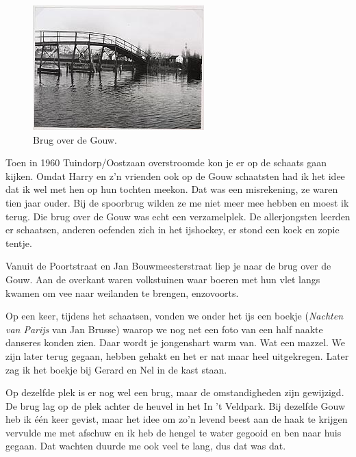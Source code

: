 \documentclass[12pt,twoside]{memoir}
\begin{document}
\begin{figure}
\includegraphics[width=\textwidth]{img/ch13/Gouwbrug}
\caption*{\footnotesize Brug over de Gouw.}
\end{figure}

Toen in 1960 Tuindorp/Oostzaan overstroomde kon je er op de schaats gaan kijken. Omdat Harry en z’n vrienden ook op de Gouw schaatsten had ik het idee dat ik wel met hen op hun tochten meekon. Dat was een misrekening, ze waren tien jaar ouder. Bij de spoorbrug wilden ze me niet meer mee hebben en moest ik terug. Die brug over de Gouw was echt een verzamelplek. De allerjongsten leerden er schaatsen, anderen oefenden zich in het ijshockey, er stond een koek en zopie tentje.

Vanuit de Poortstraat en Jan Bouwmeesterstraat liep je naar de brug over de Gouw. Aan de overkant waren volkstuinen waar boeren met hun vlet langs kwamen om vee naar weilanden te brengen, enzovoorts. 

Op een keer, tijdens het schaatsen, vonden we onder het ijs een boekje (\emph{Nachten van Parijs} van Jan Brusse) waarop we nog net een foto van een half naakte danseres konden zien. Daar wordt je jongenshart warm van. Wat een mazzel. We zijn later terug gegaan, hebben gehakt en het er nat maar heel uitgekregen. Later zag ik het boekje bij Gerard en Nel in de kast staan. 

Op dezelfde plek is er nog wel een brug, maar de omstandigheden zijn gewijzigd. De brug lag op de plek achter de heuvel in het In ’t Veldpark. Bij dezelfde Gouw heb ik één keer gevist, maar het idee om zo’n levend beest aan de haak te krijgen vervulde me met afschuw en ik heb de hengel te water gegooid en ben naar huis gegaan. Dat wachten duurde me ook veel te lang, dus dat was dat. 
\end{document}
